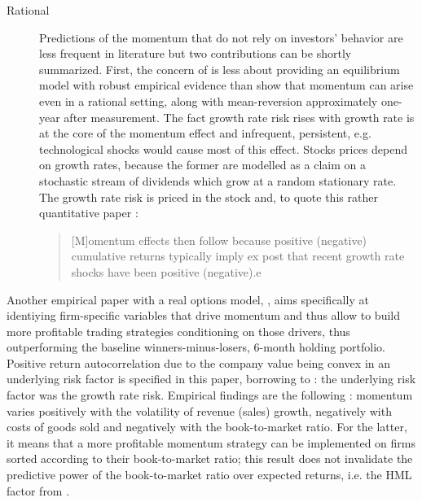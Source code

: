 \begin{description}
\item[Rational] Predictions of the momentum that do not rely on investors' behavior are less frequent in literature but two contributions can be shortly summarized. First, the concern of \textcite{Johnson2002} is less about providing an equilibrium model with robust empirical evidence than show that momentum can arise even in a rational setting, along with mean-reversion approximately one-year after measurement. The fact growth rate risk rises with growth rate is at the core of the momentum effect and infrequent, persistent, e.g. technological shocks would cause most of this effect. Stocks prices depend on growth rates, because the former are modelled as a claim on a stochastic stream of dividends which grow at a random stationary rate. The growth rate risk is priced in the stock and, to quote this rather quantitative paper :
  \begin{quote}
    [M]omentum effects then follow because positive (negative) cumulative returns typically imply ex post that recent growth rate shocks have been positive (negative).e
    \end{quote}
\end{description}
Another empirical paper with a real options model, \textcite{Sagi2007}, aims specifically at identiying firm-specific variables that drive momentum and thus allow to build more profitable trading strategies conditioning on those drivers, thus outperforming the baseline \textcite{Jegadeesh1993} winners-minus-losers, 6-month holding portfolio. Positive return autocorrelation due to the company value being convex in an underlying risk factor is specified in this paper, borrowing to \textcite{Johnson2002} : the underlying risk factor was the growth rate risk. Empirical findings are the following : momentum varies positively with the volatility of revenue (sales) growth, negatively with costs of goods sold and negatively with the book-to-market ratio. For the latter, it means that a more profitable momentum strategy can be implemented on firms sorted according to their book-to-market ratio; this result does not invalidate the predictive power of the book-to-market ratio over expected returns, i.e. the HML factor from \textcite{Fama1992}.

